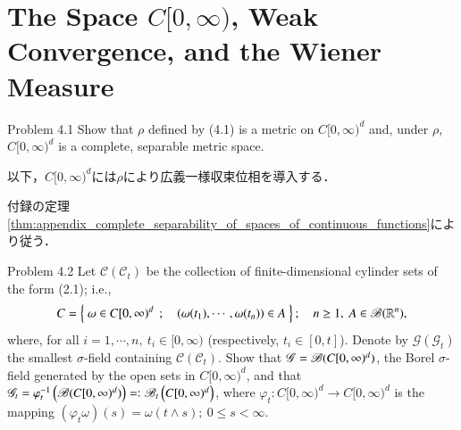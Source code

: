 \section{The Space $C[0,\infty)$, Weak Convergence, and the Wiener Measure}
	\begin{itembox}[l]{Problem 4.1}
		Show that $\rho$ defined by (4.1) is a metric on $C[0,\infty)^d$ and, under $\rho$, 
		$C[0,\infty)^d$ is a complete, separable metric space.
	\end{itembox}
	以下，$C[0,\infty)^d$には$\rho$により広義一様収束位相を導入する．
	
	\begin{prf}
		付録の定理\ref{thm:appendix_complete_separability_of_spaces_of_continuous_functions}により従う．
		\QED
	\end{prf}

\begin{itembox}[l]{Problem 4.2}
	Let $\mathscr{C}(\mathscr{C}_t)$ be the collection of finite-dimensional cylinder sets of the form (2.1); i.e.,
	\begin{align}
		C = \left\{\ \omega \in C[0,\infty)^d\ \, ; \quad (\omega(t_1),\cdots,\omega(t_n)) \in A\ \right\};
		\quad n \geq 1,\ A \in \mathscr{B}(\mathbb{R}^n),
	\end{align}
	where, for all $i=1,\cdots,n,\ t_i \in [0,\infty)$ (respectively, $t_i \in [0,t]$).
	Denote by $\mathscr{G}(\mathscr{G}_t)$ the smallest $\sigma$-field containing $\mathscr{C}(\mathscr{C}_t)$.
	Show that $\mathscr{G} = \mathscr{B}(C[0,\infty)^d)$, the Borel $\sigma$-field generated by the open sets in
	$C[0,\infty)^d$, and that $\mathscr{G}_t = \varphi_t^{-1}\left( \mathscr{B}(C[0,\infty)^d) \right) =\mathrel{\mathop:}
	\mathscr{B}_t\left( C[0,\infty)^d \right)$, where $\varphi_t:C[0,\infty)^d \longrightarrow C[0,\infty)^d$ is the
	mapping $(\varphi_t\omega)(s) = \omega(t \wedge s);\ 0 \leq s < \infty$.
\end{itembox}

